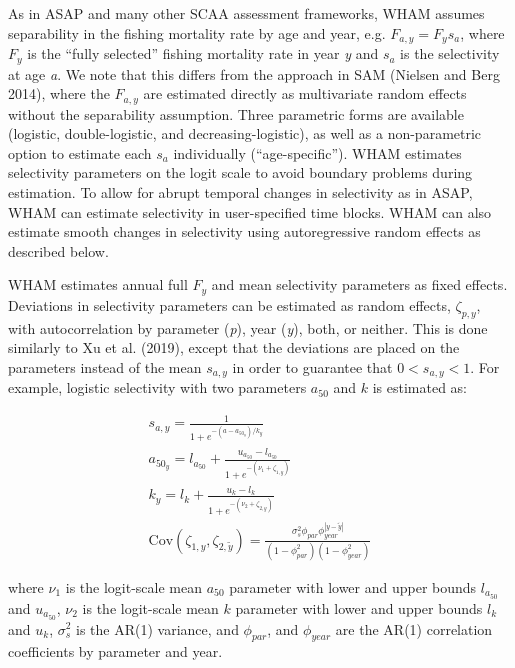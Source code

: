 \documentclass[]{article}
\begin{document}
As in ASAP and many other SCAA assessment frameworks, WHAM assumes
separability in the fishing mortality rate by age and year, e.g.
\(F_{a,y} = F_y s_a\), where \(F_y\) is the ``fully selected'' fishing
mortality rate in year \emph{y} and \(s_a\) is the selectivity at age
\emph{a}. We note that this differs from the approach in SAM (Nielsen
and Berg 2014), where the \(F_{a,y}\) are estimated directly as
multivariate random effects without the separability assumption. Three
parametric forms are available (logistic, double-logistic, and
decreasing-logistic), as well as a non-parametric option to estimate
each \(s_a\) individually (``age-specific''). WHAM estimates selectivity
parameters on the logit scale to avoid boundary problems during
estimation. To allow for abrupt temporal changes in selectivity as in
ASAP, WHAM can estimate selectivity in user-specified time blocks. WHAM
can also estimate smooth changes in selectivity using autoregressive
random effects as described below.

WHAM estimates annual full \(F_y\) and mean selectivity parameters as
fixed effects. Deviations in selectivity parameters can be estimated as
random effects, \(\zeta_{p,y}\), with autocorrelation by parameter
(\emph{p}), year (\emph{y}), both, or neither. This is done similarly to
Xu et al. (2019), except that the deviations are placed on the
parameters instead of the mean \(s_{a,y}\) in order to guarantee that
\(0 < s_{a,y} < 1\). For example, logistic selectivity with two
parameters \(a_{50}\) and \(k\) is estimated as:

\begin{equation}
  \begin{array}{cccc}
    s_{a,y} = \frac{1}{1 + e^{-(a - a_{{50}_y}) / k_y}} \\
    a_{{50}_y} = l_{a_{50}} + \frac{u_{a_{50}} - l_{a_{50}}}{1 + e^{-(\nu_1 + \zeta_{1,y})}} \\
    k_y = l_k + \frac{u_k - l_k}{1 + e^{-(\nu_2 + \zeta_{2,y})}} \\
    \text{Cov} \left( \zeta_{1,y}, \zeta_{2,\tilde{y}} \right) = \frac{\sigma^2_s \phi_{par} \phi^{|y-\tilde{y}|}_{year}}{\left(1-\phi^2_{par}\right) \left(1-\phi^2_{year}\right)}
  \end{array}
\end{equation}

where \(\nu_1\) is the logit-scale mean \(a_{50}\) parameter with lower
and upper bounds \(l_{a_{50}}\) and \(u_{a_{50}}\), \(\nu_2\) is the
logit-scale mean \(k\) parameter with lower and upper bounds \(l_k\) and
\(u_k\), \(\sigma^2_s\) is the AR(1) variance, and \(\phi_{par}\), and
\(\phi_{year}\) are the AR(1) correlation coefficients by parameter and
year.
\end{document}
